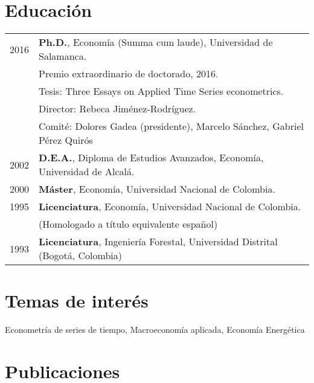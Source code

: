 \documentclass[11pt]{article}\usepackage[]{graphicx}\usepackage[]{color}
\begin{document}

\section{Educación} 

\begin{tabular}{rl{-2cm}} %

2016 & \textbf{Ph.D.}, Economía (Summa cum laude), Universidad de Salamanca.\\
& Premio extraordinario de doctorado, 2016.\\
& Tesis: Three Essays on Applied Time Series econometrics.\\
& Director: Rebeca Jiménez-Rodríguez.\\
& Comité: Dolores Gadea (presidente), Marcelo Sánchez, Gabriel Pérez Quirós\\

2002 & \textbf{D.E.A.}, Diploma de Estudios Avanzados, Economía, Universidad de Alcalá.\\
	 
2000 & \textbf{Máster}, Economía, Universidad Nacional de Colombia.\\

1995 & \textbf{Licenciatura}, Economía, Universidad Nacional de Colombia.\\
& (Homologado a título equivalente español)\\

1993 & \textbf{Licenciatura}, Ingeniería Forestal, Universidad Distrital (Bogotá, Colombia)\\

\end{tabular}
\vspace{10pt}

\section{Temas de interés}

Econometría de series de tiempo, Macroeconomía aplicada, Economía Energética


\section{Publicaciones}
\end{document}

